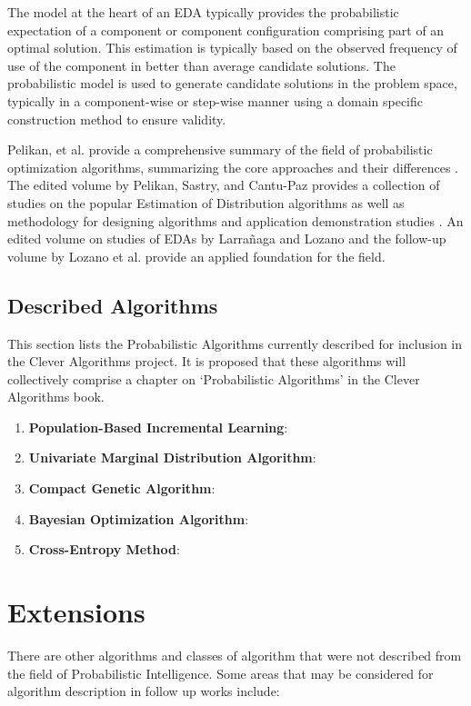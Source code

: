 \documentclass[a4paper, 11pt]{article}
\begin{document}
The model at the heart of an EDA typically provides the probabilistic expectation of a component or component configuration comprising part of an optimal solution. This estimation is typically based on the observed frequency of use of the component in better than average candidate solutions. The probabilistic model is used to generate candidate solutions in the problem space, typically in a component-wise or step-wise manner using a domain specific construction method to ensure validity.

Pelikan, et al. provide a comprehensive summary of the field of probabilistic optimization algorithms, summarizing the core approaches and their differences \cite{Pelikan2002b}.
The edited volume by Pelikan, Sastry, and Cantu-Paz provides a collection of studies on the popular Estimation of Distribution algorithms as well as methodology for designing algorithms and application demonstration studies \cite{Pelikan2006}.
An edited volume on studies of EDAs by Larrañaga and Lozano \cite{Larranaga2002} and the follow-up volume by Lozano et al. \cite{Lozano2006} provide an applied foundation for the field.


% 
% 
\subsection{Described Algorithms}
\label{subsec:algorithms}
This section lists the Probabilistic Algorithms currently described for inclusion in the Clever Algorithms project. It is proposed that these algorithms will collectively comprise a chapter on `Probabilistic Algorithms' in the Clever Algorithms book. 

\begin{enumerate}
	\item \textbf{Population-Based Incremental Learning}: \cite{Brownlee2010ap}
	\item \textbf{Univariate Marginal Distribution Algorithm}: \cite{Brownlee2010aq}
	\item \textbf{Compact Genetic Algorithm}: \cite{Brownlee2010ar}
	\item \textbf{Bayesian Optimization Algorithm}: \cite{Brownlee2010as}
	\item \textbf{Cross-Entropy Method}: \cite{Brownlee2010at}
\end{enumerate}

% 
% 
\section{Extensions}
\label{sec:extensions}
There are other algorithms and classes of algorithm that were not described from the field of Probabilistic Intelligence. Some areas that may be considered for algorithm description in follow up works include:
\end{document}
